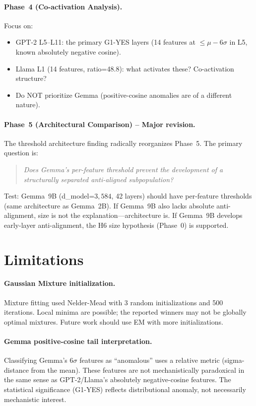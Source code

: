 \documentclass[11pt,a4paper]{article}
\begin{document}
\paragraph{Phase~4 (Co-activation Analysis).} Focus on:
\begin{itemize}[nosep]
  \item GPT-2 L5--L11: the primary G1-YES layers (14 features at $\leq\mu{-}6\sigma$ in L5, known absolutely negative cosine).
  \item Llama L1 (14 features, ratio=48.8): what activates these? Co-activation structure?
  \item Do NOT prioritize Gemma (positive-cosine anomalies are of a different nature).
\end{itemize}

\paragraph{Phase~5 (Architectural Comparison) -- Major revision.} The threshold architecture finding radically reorganizes Phase~5. The primary question is:
\begin{quote}
\emph{Does Gemma's per-feature threshold prevent the development of a structurally separated anti-aligned subpopulation?}
\end{quote}
Test: Gemma~9B (d\_model=$3{,584}$, 42 layers) should have per-feature thresholds (same architecture as Gemma~2B). If Gemma~9B also lacks absolute anti-alignment, size is not the explanation---architecture is. If Gemma~9B develops early-layer anti-alignment, the H6 size hypothesis (Phase~0) is supported.

\section{Limitations}
\label{sec:limitations}

\paragraph{Gaussian Mixture initialization.} Mixture fitting used Nelder-Mead with 3 random initializations and 500 iterations. Local minima are possible; the reported winners may not be globally optimal mixtures. Future work should use EM with more initializations.

\paragraph{Gemma positive-cosine tail interpretation.} Classifying Gemma's $6\sigma$ features as ``anomalous'' uses a relative metric (sigma-distance from the mean). These features are not mechanistically paradoxical in the same sense as GPT-2/Llama's absolutely negative-cosine features. The statistical significance (G1-YES) reflects distributional anomaly, not necessarily mechanistic interest.
\end{document}
